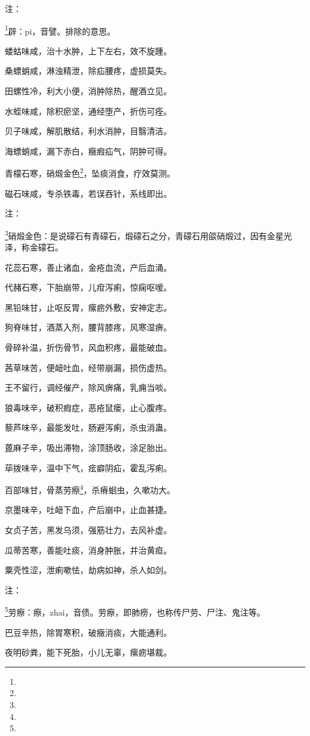 \documentclass[a4paper,12pt,UTF8,twoside]{ctexbook}
\begin{document}
注：

\footnote{}辟：pi，音譬。排除的意思。

蝼蛄味咸，治十水肿，上下左右，效不旋踵。

桑螵蛸咸，淋浊精泄，除疝腰疼，虚损莫失。

田螺性冷，利大小便，消肿除热，醒酒立见。

水蛭味咸，除积瘀坚，通经堕产，折伤可痊。

贝子味咸，解肌散结，利水消肿，目翳清洁。

海螵蛸咸，漏下赤白，癥瘕疝气，阴肿可得。

青檬石寒，硝煅金色\footnote{}，坠痰消食，疗效莫测。

磁石味咸，专杀铁毒，若误吞针，系线即出。

注：

\footnote{}硝煅金色：是说礞石有青礞石，煅礞石之分，青礞石用燄硝煅过，因有金星光泽，称金礞石。

花蕊石寒，善止诸血，金疮血流，产后血涌。

代赭石寒，下胎崩带，儿疳泻痢，惊痫呕嗳。

黑铅味甘，止呕反胃，瘰疬外敷，安神定志。

狗脊味甘，酒蒸入剂，腰背膝疼，风寒湿痹。

骨碎补温，折伤骨节，风血积疼，最能破血。

茜草味苦，便衄吐血，经带崩漏，损伤虚热。

王不留行，调经催产，除风痹痛，乳痈当啖。

狼毒味辛，破积瘕症，恶疮鼠瘘，止心腹疼。

藜芦味辛，最能发吐，肠避泻痢，杀虫消蛊。

蓖麻子辛，吸出滞物，涂顶肠收，涂足胎出。

荜拨味辛，温中下气，痃癖阴疝，霍乱泻痢。

百部味甘，骨蒸劳瘵\footnote{}，杀瘠蛔虫，久嗽功大。

京墨味辛，吐衄下血，产后崩中，止血甚捷。

女贞子苦，黑发乌须，强筋壮力，去风补虚。

瓜蒂苦寒，善能吐痰，消身肿胀，并治黄疸。

粟壳性涩，泄痢嗽怯，劫病如神，杀人如剑。

注：

\footnote{}劳瘵：瘵，zhai，音债。劳瘵，即肺痨，也称传尸劳、尸注、鬼注等。

巴豆辛热，除胃寒积，破癥消痰，大能通利。

夜明砂粪，能下死胎，小儿无辜，瘰疬堪裁。
\end{document}
